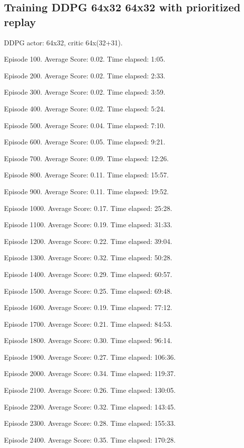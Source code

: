 \documentclass{report}
\begin{document}
\subsection*{Training DDPG 64x32 64x32 with prioritized replay}

DDPG actor: 64x32, critic 64x(32+31).

Episode 100.	Average Score: 0.02.	Time elapsed: 1:05.

Episode 200.	Average Score: 0.02.	Time elapsed: 2:33.

Episode 300.	Average Score: 0.02.	Time elapsed: 3:59.

Episode 400.	Average Score: 0.02.	Time elapsed: 5:24.

Episode 500.	Average Score: 0.04.	Time elapsed: 7:10.

Episode 600.	Average Score: 0.05.	Time elapsed: 9:21.

Episode 700.	Average Score: 0.09.	Time elapsed: 12:26.

Episode 800.	Average Score: 0.11.	Time elapsed: 15:57.

Episode 900.	Average Score: 0.11.	Time elapsed: 19:52.

Episode 1000.	Average Score: 0.17.	Time elapsed: 25:28.

Episode 1100.	Average Score: 0.19.	Time elapsed: 31:33.

Episode 1200.	Average Score: 0.22.	Time elapsed: 39:04.

Episode 1300.	Average Score: 0.32.	Time elapsed: 50:28.

Episode 1400.	Average Score: 0.29.	Time elapsed: 60:57.

Episode 1500.	Average Score: 0.25.	Time elapsed: 69:48.

Episode 1600.	Average Score: 0.19.	Time elapsed: 77:12.

Episode 1700.	Average Score: 0.21.	Time elapsed: 84:53.

Episode 1800.	Average Score: 0.30.	Time elapsed: 96:14.

Episode 1900.	Average Score: 0.27.	Time elapsed: 106:36.

Episode 2000.	Average Score: 0.34.	Time elapsed: 119:37.

Episode 2100.	Average Score: 0.26.	Time elapsed: 130:05.

Episode 2200.	Average Score: 0.32.	Time elapsed: 143:45.

Episode 2300.	Average Score: 0.28.	Time elapsed: 155:33.

Episode 2400.	Average Score: 0.35.	Time elapsed: 170:28.
\end{document}
